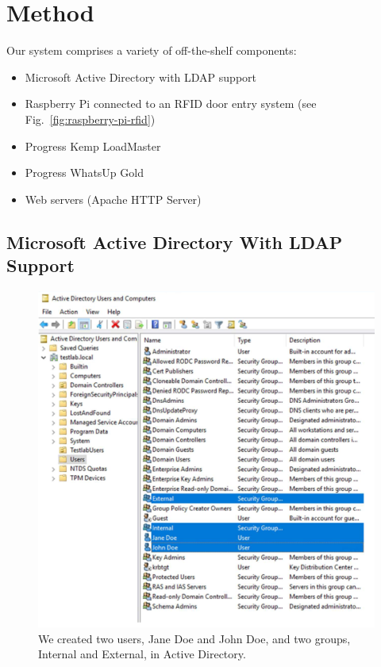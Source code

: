 \section{Method}\label{sec:method}

Our system comprises a variety of off-the-shelf components:

\begin{itemize}
\item Microsoft Active Directory with LDAP support
\item Raspberry Pi connected to an RFID door entry system (see
  Fig.~\ref{fig:raspberry-pi-rfid})
\item Progress Kemp LoadMaster~\cite{progress-kemp-loadmaster-xx}
\item Progress WhatsUp Gold~\cite{progress-kemp-whatsup-gold-xx}
\item Web servers (Apache HTTP Server)
\end{itemize}

\subsection{Microsoft Active Directory With LDAP Support}

\begin{figure}
  \centerline{\includegraphics[width=\columnwidth]{img/active-directory}}
  \caption{We created two users, Jane Doe and John Doe, and two
    groups, Internal and External, in Active
    Directory.}\label{fig:active-directory}
\end{figure}

